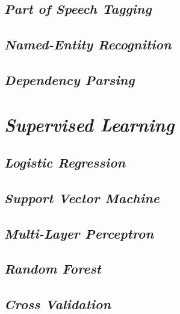 \lipsum[4]

\subsection{\textit{Part of Speech Tagging}}

\lipsum[4]

\subsection{\textit{Named-Entity Recognition}}

\lipsum[5]

\subsection{\textit{Dependency Parsing}}

\lipsum[6]

\section{\textit{Supervised Learning}}

\lipsum[3]

\subsection{\textit{Logistic Regression}}

\lipsum[4]

\subsection{\textit{Support Vector Machine}}

\lipsum[5]

\subsection{\textit{Multi-Layer Perceptron}}

\lipsum[6]

\subsection{\textit{Random Forest}}

\lipsum[7]

\subsection{\textit{Cross Validation}}

\lipsum[8]
